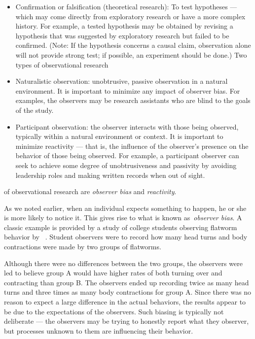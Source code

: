 \begin{refsection}
\begin{itemize}
\item Confirmation or falsification (theoretical research): To test hypotheses --- which may come directly from exploratory research or have a more complex history. For example, a tested hypothesis may be obtained by revising a hypothesis that was suggested by exploratory research but failed to be confirmed. (Note: If the hypothesis concerns a causal claim, observation alone will not provide strong test; if possible, an experiment should be done.)
Two types of observational research

\item Naturalistic observation: unobtrusive, passive observation in a natural environment. It is important to minimize any impact of observer bias. For examples, the observers may be research assistants who are blind to the goals of the study.

\item Participant observation: the observer interacts with those being observed, typically within a natural environment or context. It is important to minimize reactivity --- that is, the influence of the observer's presence on the behavior of those being observed. For example, a participant observer can seek to achieve some degree of unobtrusiveness and passivity by avoiding leadership roles and making written records when out of sight.

\end{itemize}

 of observational research are \emph{observer bias} and \emph{reactivity}.

As we noted earlier, when an individual expects something to happen, he or she is more likely to notice it. This gives rise to what is known as \emph{observer bias}. A classic example is provided by a study of college students observing flatworm behavior by ~\citep{Cordaro:2016bv}. Student observers were to record how many head turns and body contractions were made by two groups of flatworms. 

Although there were no differences between the two groups, the observers were led to believe group A would have higher rates of both turning over and contracting than group B. The observers ended up recording twice as many head turns and three times as many body contractions for group A. Since there was no reason to expect a large difference in the actual behaviors, the results appear to be due to the expectations of the observers. Such biasing is typically not deliberate --- the observers may be trying to honestly report what they observer, but processes unknown to them are influencing their behavior.


\end{refsection}
